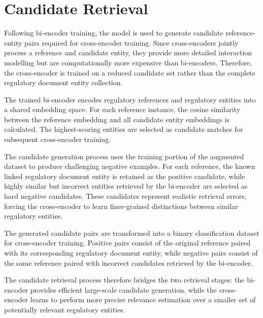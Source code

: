 \section{Candidate Retrieval}

Following bi-encoder training, the model is used to generate candidate
reference-entity pairs required for cross-encoder training. Since cross-encoders
jointly process a reference and candidate entity, they provide more detailed
interaction modelling but are computationally more expensive than bi-encoders.
Therefore, the cross-encoder is trained on a reduced candidate set rather than
the complete regulatory document entity collection.

The trained bi-encoder encodes regulatory references and regulatory entities into
a shared embedding space. For each reference instance, the cosine similarity
between the reference embedding and all candidate entity embeddings is
calculated. The highest-scoring entities are selected as candidate matches for
subsequent cross-encoder training.

The candidate generation process uses the training portion of the augmented
dataset to produce challenging negative examples. For each reference, the known
linked regulatory document entity is retained as the positive candidate, while highly
similar but incorrect entities retrieved by the bi-encoder are selected as hard
negative candidates. These candidates represent realistic retrieval errors,
forcing the cross-encoder to learn finer-grained distinctions between similar
regulatory entities.

The generated candidate pairs are transformed into a binary classification
dataset for cross-encoder training. Positive pairs consist of the original
reference paired with its corresponding regulatory document entity, while negative pairs
consist of the same reference paired with incorrect candidates retrieved by the
bi-encoder.

The candidate retrieval process therefore bridges the two retrieval stages:
the bi-encoder provides efficient large-scale candidate generation, while the
cross-encoder learns to perform more precise relevance estimation over a smaller
set of potentially relevant regulatory entities.